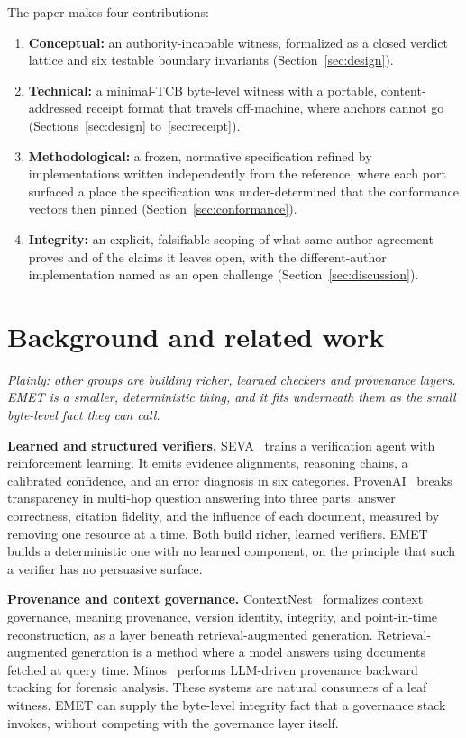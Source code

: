 \documentclass[11pt]{article}
\begin{document}
The paper makes four contributions:
\begin{enumerate}[leftmargin=*,itemsep=2pt]
\item \textbf{Conceptual:} an authority-incapable witness, formalized as a closed verdict lattice and six testable boundary invariants (Section~\ref{sec:design}).
\item \textbf{Technical:} a minimal-TCB byte-level witness with a portable, content-addressed receipt format that travels off-machine, where anchors cannot go (Sections~\ref{sec:design} to~\ref{sec:receipt}).
\item \textbf{Methodological:} a frozen, normative specification refined by implementations written independently from the reference, where each port surfaced a place the specification was under-determined that the conformance vectors then pinned (Section~\ref{sec:conformance}).
\item \textbf{Integrity:} an explicit, falsifiable scoping of what same-author agreement proves and of the claims it leaves open, with the different-author implementation named as an open challenge (Section~\ref{sec:discussion}).
\end{enumerate}

\section{Background and related work}
\emph{Plainly: other groups are building richer, learned checkers and provenance layers. EMET is a smaller, deterministic thing, and it fits underneath them as the small byte-level fact they can call.}

\textbf{Learned and structured verifiers.} SEVA~\cite{seva} trains a verification agent with reinforcement learning. It emits evidence alignments, reasoning chains, a calibrated confidence, and an error diagnosis in six categories. ProvenAI~\cite{provenai} breaks transparency in multi-hop question answering into three parts: answer correctness, citation fidelity, and the influence of each document, measured by removing one resource at a time. Both build richer, learned verifiers. EMET builds a deterministic one with no learned component, on the principle that such a verifier has no persuasive surface.

\textbf{Provenance and context governance.} ContextNest~\cite{contextnest} formalizes context governance, meaning provenance, version identity, integrity, and point-in-time reconstruction, as a layer beneath retrieval-augmented generation. Retrieval-augmented generation is a method where a model answers using documents fetched at query time. Minos~\cite{minos} performs LLM-driven provenance backward tracking for forensic analysis. These systems are natural consumers of a leaf witness. EMET can supply the byte-level integrity fact that a governance stack invokes, without competing with the governance layer itself.
\end{document}
